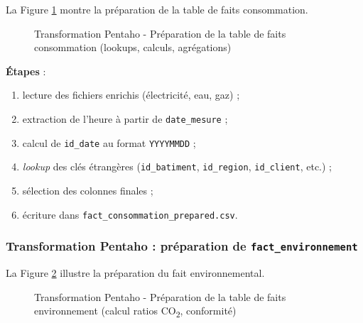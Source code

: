 \documentclass[12pt,a4paper]{report}
\begin{document}
La Figure \ref{fig:fact_consommation} montre la préparation de la table de faits consommation.

\begin{figure}[H]
    \centering
    \caption{Transformation Pentaho - Préparation de la table de faits consommation (lookups, calculs, agrégations)}
    \label{fig:fact_consommation}
\end{figure}

\textbf{Étapes} :
\begin{enumerate}
    \item lecture des fichiers enrichis (électricité, eau, gaz) ;
    \item extraction de l'heure à partir de \texttt{date\_mesure} ;
    \item calcul de \texttt{id\_date} au format \texttt{YYYYMMDD} ;
    \item \textit{lookup} des clés étrangères (\texttt{id\_batiment}, \texttt{id\_region}, \texttt{id\_client}, etc.) ;
    \item sélection des colonnes finales ;
    \item écriture dans \texttt{fact\_consommation\_prepared.csv}.
\end{enumerate}

\subsubsection{Transformation Pentaho : préparation de \texttt{fact\_environnement}}

La Figure \ref{fig:fact_environnement} illustre la préparation du fait environnemental.

\begin{figure}[H]
    \centering
    \caption{Transformation Pentaho - Préparation de la table de faits environnement (calcul ratios CO\textsubscript{2}, conformité)}
    \label{fig:fact_environnement}
\end{figure}
\end{document}
